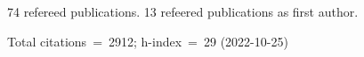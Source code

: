 74 refereed publications. 13 refeered publications as first author.

Total citations~=~2912; h-index~=~29 (2022-10-25)